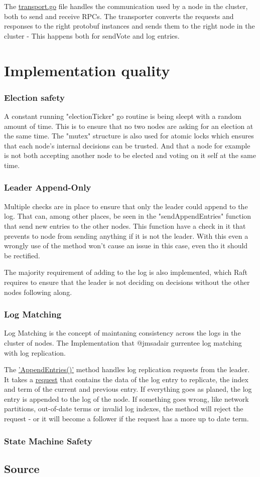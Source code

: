 \documentclass[a4paper,11pt]{article}
\begin{document}
The \href{https://github.com/jmsadair/raft/blob/dev/transport.go}{transport.go} file handles the communication used by a node in the cluster, both to send and receive RPCs. 
The transporter converts the requests and responses to the right protobuf instances and sends them to the right node in the cluster - This happens both for sendVote and log entries. 
\section*{Implementation quality}

\subsubsection*{Election safety}
A constant running "electionTicker" go routine is being sleept with a random amount of time.
This is to ensure that no two nodes are asking for an election at the same time.
The "mutex" structure is also used for atomic locks which ensures that each node's internal decisions can be trusted.
And that a node for example is not both accepting another node to be elected and voting on it self at the same time.

\subsubsection*{Leader Append-Only}
Multiple checks are in place to ensure that only the leader could append to the log.
That can, among other places, be seen in the "sendAppendEntries" function that send new entries to the other nodes.
This function have a check in it that prevents to node from sending anything if it is not the leader.
With this even a wrongly use of the method won't cause an issue in this case, even tho it should be rectified.

The majority requirement of adding to the log is also implemented, 
which Raft requires to ensure that the leader is not deciding on decisions without the other nodes following along.

\subsubsection*{Log Matching}
Log Matching is the concept of maintaning consistency across the logs in the cluster of nodes. The Implementation that @jmsadair gurrentee log matching with log replication.

The \href{https://github.com/jmsadair/raft/blob/dev/raft.go#L797}{'AppendEntries()'} method handles log replication requests from the leader. It takes a \href{https://github.com/jmsadair/raft/blob/c7c645603a7a495d858771f1e91f8b5a76cd798d/internal/protobuf/raft.proto#L17}{request} that contains the data of the log entry to replicate, the index and term of the current and previous entry.
If everything goes as planed, the log entry is appended to the log of the node.
If something goes wrong, like network partitions, out-of-date terms or invalid log indexes, the method will reject the request - or it will become a follower if the request has a more up to date term.

\subsubsection*{State Machine Safety}

\subsection*{Source}
\end{document}
